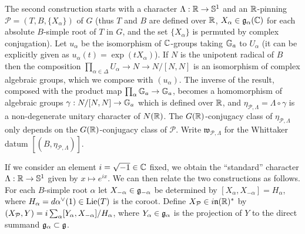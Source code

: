 \documentclass{article}
\theoremstyle{definition}
\numberwithin{equation}{section}
\renewcommand{\-}{\hyp{}}
\renewcommand{\P}{\mathcal P}
\newcommand{\w}{\mathfrak w}
\begin{document}
The second construction starts with a character $\Lambda : \mathbb{R} \to \mathbb{S}^1$ and an $\mathbb{R}$-pinning $\P=(T,B,\{X_\alpha\})$ of $G$ (thus $T$ and $B$ are defined over $\mathbb{R}$, $X_\alpha \in \mathfrak{g}_\alpha(\mathbb{C})$ for each absolute $B$-simple root of $T$ in $G$, and the set $\{X_\alpha\}$ is permuted by complex conjugation).  
Let $u_\alpha$ be the isomorphism of $\mathbb{C}$-groups taking $\mathbb{G}_a$ to $U_\alpha$ (it can be explicitly given as $u_\alpha(t)=\exp(t X_\alpha)$). 
If $N$ is the unipotent radical of $B$ then the
composition $\prod_{\alpha \in \Delta} U_\alpha \to N \to N/[N,N]$ is
an isomorphism of complex algebraic groups, which we compose with
$(u_\alpha)$. The inverse of the result, composed with the product map
$\prod_\alpha \mathbb{G}_a \to \mathbb{G}_a$, becomes a homomorphism of
algebraic groups $\gamma : N/[N,N] \to \mathbb{G}_a$ which is  defined over $\mathbb{R}$, and 
 $\eta_{\P,\Lambda}=\Lambda\circ \gamma$ is a non-degenerate unitary character of $N(\mathbb{R})$.
The $G(\mathbb{R})$-conjugacy class of $\eta_{\P,\Lambda}$ only depends on the $G(\mathbb{R})$-conjugacy class of  $\P$.
  Write $\w_{\P,\Lambda}$ for the Whittaker datum
$[(B,\eta_{\P,\Lambda})]$. 

If we consider an element $i=\sqrt{-1} \in \mathbb{C}$ fixed, we obtain the ``standard'' character $\Lambda : \mathbb{R} \to \mathbb{S}^1$ given by $x \mapsto e^{ix}$. We can then relate the two constructions as follows. For each $B$-simple root $\alpha$ let $X_{-\alpha} \in \mathfrak{g}_{-\alpha}$ be determined by $[X_\alpha,X_{-\alpha}]=H_\alpha$, where $H_\alpha=d\alpha^\vee(1) \in \textrm{Lie}(T)$ is the coroot. Define $X_{\mathcal{P}} \in i\mathfrak{n}(\mathbb{R})^*$ by $(X_{\mathcal{P}},Y)=i\sum_\alpha [Y_\alpha,X_{-\alpha}]/H_\alpha$, where $Y_\alpha \in \mathfrak{g}_\alpha$ is the projection of $Y$ to the direct summand $\mathfrak{g}_\alpha \subset \mathfrak{g}$.
\end{document}
